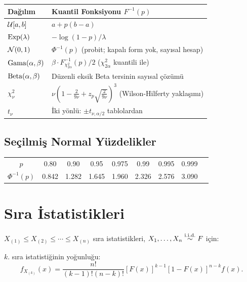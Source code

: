 \begin{center}
\renewcommand{\arraystretch}{1.5}
\small
\begin{tabular}{p{2.8cm}p{8cm}}
\hline
\textbf{Dağılım} & \textbf{Kuantil Fonksiyonu} $F^{-1}(p)$ \\
\hline
$\mathcal{U}[a,b]$ & $a + p(b-a)$ \\
$\operatorname{Exp}(\lambda)$ & $-\log(1-p)/\lambda$ \\
$\mathcal{N}(0,1)$ & $\Phi^{-1}(p)$ (probit; kapalı form yok, sayısal hesap) \\
$\operatorname{Gama}(\alpha,\beta)$ & $\beta \cdot F^{-1}_{\chi^2_{2\alpha}}(p)/2$ ($\chi^2_{2\alpha}$ kuantili ile) \\
$\operatorname{Beta}(\alpha,\beta)$ & Düzenli eksik Beta tersinin sayısal çözümü \\
$\chi^2_\nu$ & $\nu\left(1 - \frac{2}{9\nu} + z_p\sqrt{\frac{2}{9\nu}}\right)^3$ (Wilson-Hilferty yaklaşımı) \\
$t_\nu$ & İki yönlü: $\pm t_{\nu,\alpha/2}$ tablolardan \\
\hline
\end{tabular}
\end{center}

\subsection{Seçilmiş Normal Yüzdelikler}

\begin{center}
\small
\begin{tabular}{ccccccccc}
\hline
$p$ & 0.80 & 0.90 & 0.95 & 0.975 & 0.99 & 0.995 & 0.999 \\
$\Phi^{-1}(p)$ & 0.842 & 1.282 & 1.645 & 1.960 & 2.326 & 2.576 & 3.090 \\
\hline
\end{tabular}
\end{center}

\section{Sıra İstatistikleri}
\label{app:sira_istatistikleri}

$X_{(1)}\leq X_{(2)}\leq\cdots\leq X_{(n)}$ sıra istatistikleri, $X_1,\ldots,X_n\overset{\text{i.i.d.}}{\sim} F$ için:

\begin{teorem}
$k$. sıra istatistiğinin yoğunluğu:
\[
  f_{X_{(k)}}(x) = \frac{n!}{(k-1)!(n-k)!}[F(x)]^{k-1}[1-F(x)]^{n-k}f(x).
\]
\end{teorem}

